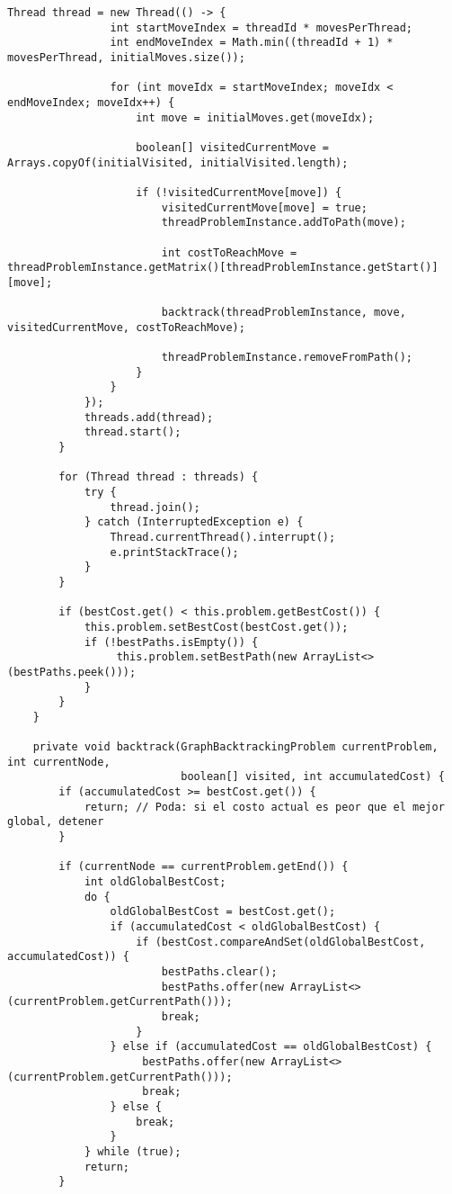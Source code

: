 \documentclass[12pt]{article}
\begin{document}
\begin{lstlisting}[caption={Implementación Paralela con Threads en Java (`ParallelGraphSolver.java`)}]
            Thread thread = new Thread(() -> {
                int startMoveIndex = threadId * movesPerThread;
                int endMoveIndex = Math.min((threadId + 1) * movesPerThread, initialMoves.size());

                for (int moveIdx = startMoveIndex; moveIdx < endMoveIndex; moveIdx++) {
                    int move = initialMoves.get(moveIdx);
                    
                    boolean[] visitedCurrentMove = Arrays.copyOf(initialVisited, initialVisited.length);
                    
                    if (!visitedCurrentMove[move]) {
                        visitedCurrentMove[move] = true;
                        threadProblemInstance.addToPath(move);
                        
                        int costToReachMove = threadProblemInstance.getMatrix()[threadProblemInstance.getStart()][move];
                        
                        backtrack(threadProblemInstance, move, visitedCurrentMove, costToReachMove);
                        
                        threadProblemInstance.removeFromPath();
                    }
                }
            });
            threads.add(thread);
            thread.start();
        }

        for (Thread thread : threads) {
            try {
                thread.join();
            } catch (InterruptedException e) {
                Thread.currentThread().interrupt();
                e.printStackTrace();
            }
        }

        if (bestCost.get() < this.problem.getBestCost()) {
            this.problem.setBestCost(bestCost.get());
            if (!bestPaths.isEmpty()) {
                 this.problem.setBestPath(new ArrayList<>(bestPaths.peek()));
            }
        }
    }

    private void backtrack(GraphBacktrackingProblem currentProblem, int currentNode, 
                           boolean[] visited, int accumulatedCost) {
        if (accumulatedCost >= bestCost.get()) {
            return; // Poda: si el costo actual es peor que el mejor global, detener
        }

        if (currentNode == currentProblem.getEnd()) {
            int oldGlobalBestCost;
            do {
                oldGlobalBestCost = bestCost.get();
                if (accumulatedCost < oldGlobalBestCost) {
                    if (bestCost.compareAndSet(oldGlobalBestCost, accumulatedCost)) {
                        bestPaths.clear();
                        bestPaths.offer(new ArrayList<>(currentProblem.getCurrentPath()));
                        break;
                    }
                } else if (accumulatedCost == oldGlobalBestCost) {
                     bestPaths.offer(new ArrayList<>(currentProblem.getCurrentPath()));
                     break;
                } else {
                    break;
                }
            } while (true);
            return;
        }


\end{lstlisting}
\end{document}
